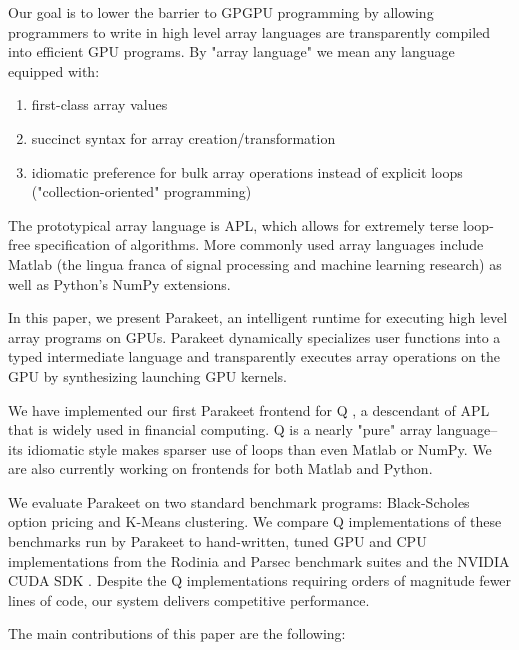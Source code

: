 \documentclass[preprint]{sigplanconf}
\begin{document}
Our goal is to lower the barrier to GPGPU programming by allowing programmers to 
write in high level array languages are transparently compiled into efficient GPU programs. 
By "array language" we mean any language equipped with: 
\begin{enumerate}
\item first-class array values 
\item succinct syntax for array creation/transformation
\item idiomatic preference for bulk array operations instead of explicit loops ("collection-oriented"\cite{Sip91} programming)
\end{enumerate}

The prototypical array language is APL\cite{Iverson62}, which allows for extremely terse loop-free specification of algorithms. More commonly used array 
languages include Matlab\cite{Moler80} (the lingua franca of signal processing and machine learning research) as well as Python's NumPy\cite{Oliphant07} extensions. 


In this paper, we present Parakeet, an intelligent runtime for executing high
level array programs on GPUs. Parakeet dynamically specializes user functions 
into a typed intermediate language and transparently executes array operations on the 
GPU by synthesizing launching GPU kernels. 


We have implemented our first Parakeet frontend for Q \cite{Borr08}, a descendant of APL that is widely used in financial computing. 
Q is a nearly "pure" array language-- its idiomatic style makes sparser use of loops than even Matlab or NumPy. 
We are also currently working on frontends for both Matlab and Python. 

We evaluate Parakeet on two standard benchmark programs: Black-Scholes option
pricing and K-Means clustering.  We compare Q implementations of these
benchmarks run by Parakeet to hand-written, tuned GPU and CPU implementations
from the Rodinia \cite{Che09} and Parsec \cite{Bien08} benchmark suites and the
NVIDIA CUDA SDK \cite{NvidSD}.  Despite the Q implementations requiring orders
of magnitude fewer lines of code, our system delivers competitive performance.

The main contributions of this paper are the following:
\end{document}
